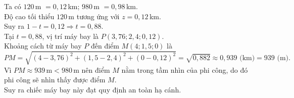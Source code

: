 \begin{ex}
{\begin{itemchoice}
			\itemch Ta có $120$\,m $= 0{,}12$\,km; $980$\,m $= 0{,}98$\,km.\\
			Độ cao tối thiểu $120$\,m tương ứng với $z = 0{,}12$\,km.\\
			Suy ra $1-t = 0{,}12 \Rightarrow t = 0{,}88$.\\
			Tại $t = 0{,}88$, vị trí máy bay là $P(3{,}76; 2{,}4; 0{,}12)$.\\
			Khoảng cách từ máy bay $P$ đến điểm $M(4; 1{,}5; 0)$ là
			\[PM = \sqrt{(4-3{,}76)^2 + (1{,}5-2{,}4)^2 + (0-0{,}12)^2} = \sqrt{0{,}882} \approx 0{,}939\text{ (km)} = 939\text{ (m)}.\]
			Vì $PM \approx 939$\,m$< 980$\,m nên điểm $M$ nằm trong tầm nhìn của phi công, do đó phi công sẽ nhìn thấy được điểm $M$.\\
			Suy ra chiếc máy bay này đạt quy định an toàn hạ cánh.
		\end{itemchoice}
	}
\end{ex}

